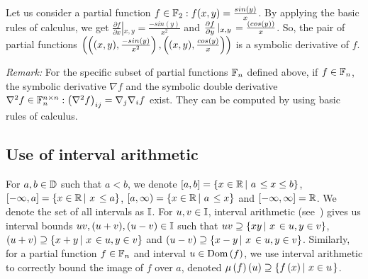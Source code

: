 %
\begin{example}
Let us consider a partial function $f\in\mathbb{F}_{2}: f(x,y) =
\frac{sin\left(y\right)}{x}$.  By applying the basic rules of calculus, we get
$\frac{\partial{f}}{\partial{x}}\left|_{x,y}\right. =
\frac{-sin(y)}{x^2}$ and
$\frac{\partial{f}}{\partial{y}}\left|_{x,y}\right. =
\frac{\left(cos(y)\right)}{x}$. So, the pair of partial functions $\left(
  \left((x,y),\frac{-sin(y)}{x^2}\right), \left((x,y), \frac{{cos(y)}}{x}\right) \right)$
  is a symbolic derivative of $f$.  
\end{example}
%
\emph{Remark:}  For the specific subset of partial functions $\mathbb{F}_{n}$
  defined above,
  if $f\in\mathbb{F}_{n}$, the symbolic derivative $\nabla{f}$ and the
symbolic double derivative $\nabla^2f\in\mathbb{F}_{n}^{n\times
n}: \left(\nabla^2 f\right)_{ij} =
\nabla_j\nabla_i f$ exist.  They can be computed by using
basic rules of calculus.
%
\subsection{Use of interval arithmetic}
For $a,b\in\mathbb{D}$ such that $a<b$, we denote $\left[a,b\right] =
\left\{x\in\mathbb{R}\left|~a\right.\leq x\leq b\right\}$, $[-\infty,a] = \left\{x\in\mathbb{R}\left|~x\right.\leq a\right\}$, $[a,\infty) = \left\{x\in\mathbb{R}\left|~a\right.\leq x\right\}$ and
  $[-\infty,\infty] = \mathbb{R}$.  We denote the set of all intervals as
  $\mathbb{I}$.  For $u,v\in\mathbb{I}$, interval arithmetic
  (see~\cite{bronnimann2006design}) gives us interval bounds
  $uv,(u+v),(u-v)\in\mathbb{I}$ such that $uv\supseteq\left\{xy\left|~x\right.\in
    u, y\in v\right\}$, $\left(u+v\right)\supseteq\left\{x+y\left|~x\right.\in u, y\in v\right\}$ and
  $\left(u-v\right)\supseteq\left\{x-y\left|~x\right.\in u, y\in v\right\}$.  Similarly, for a
  partial function $f\in \mathbb{F}_{n}$ and interval $u\in\operatorname{Dom}\left(f\right)$, we use
  interval arithmetic to correctly bound the image of $f$ over $a$,
  denoted $\mu\left(f\right)\left(u\right) \supseteq \left\{f\left(x\right)\left|~x\in u\right. \right\}$.


